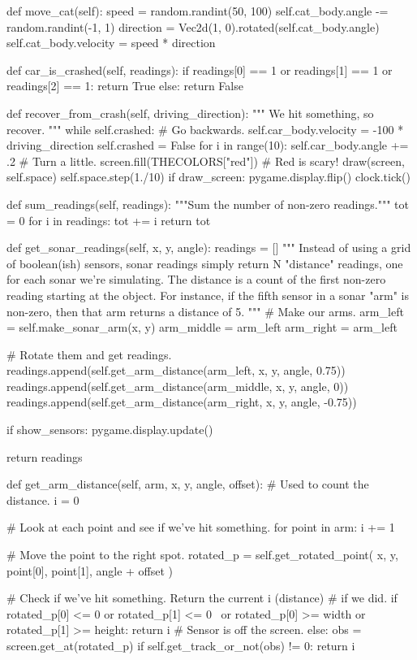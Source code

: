 \begin{python}
def move_cat(self):
speed = random.randint(50, 100)
self.cat_body.angle -= random.randint(-1, 1)
direction = Vec2d(1, 0).rotated(self.cat_body.angle)
self.cat_body.velocity = speed * direction

def car_is_crashed(self, readings):
if readings[0] == 1 or readings[1] == 1 or readings[2] == 1:
return True
else:
return False

def recover_from_crash(self, driving_direction):
"""
We hit something, so recover.
"""
while self.crashed:
# Go backwards.
self.car_body.velocity = -100 * driving_direction
self.crashed = False
for i in range(10):
self.car_body.angle += .2  # Turn a little.
screen.fill(THECOLORS["red"])  # Red is scary!
draw(screen, self.space)
self.space.step(1./10)
if draw_screen:
pygame.display.flip()
clock.tick()

def sum_readings(self, readings):
"""Sum the number of non-zero readings."""
tot = 0
for i in readings:
tot += i
return tot

def get_sonar_readings(self, x, y, angle):
readings = []
"""
Instead of using a grid of boolean(ish) sensors, sonar readings
simply return N "distance" readings, one for each sonar
we're simulating. The distance is a count of the first non-zero
reading starting at the object. For instance, if the fifth sensor
in a sonar "arm" is non-zero, then that arm returns a distance of 5.
"""
# Make our arms.
arm_left = self.make_sonar_arm(x, y)
arm_middle = arm_left
arm_right = arm_left

# Rotate them and get readings.
readings.append(self.get_arm_distance(arm_left, x, y, angle, 0.75))
readings.append(self.get_arm_distance(arm_middle, x, y, angle, 0))
readings.append(self.get_arm_distance(arm_right, x, y, angle, -0.75))

if show_sensors:
pygame.display.update()

return readings

def get_arm_distance(self, arm, x, y, angle, offset):
# Used to count the distance.
i = 0

# Look at each point and see if we've hit something.
for point in arm:
i += 1

# Move the point to the right spot.
rotated_p = self.get_rotated_point(
x, y, point[0], point[1], angle + offset
)

# Check if we've hit something. Return the current i (distance)
# if we did.
if rotated_p[0] <= 0 or rotated_p[1] <= 0 \
or rotated_p[0] >= width or rotated_p[1] >= height:
return i  # Sensor is off the screen.
else:
obs = screen.get_at(rotated_p)
if self.get_track_or_not(obs) != 0:
return i


\end{python}
